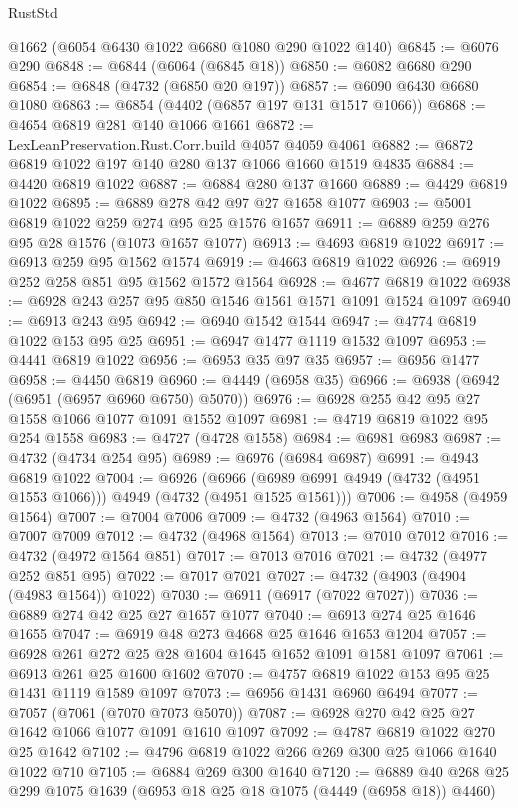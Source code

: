\begin{lexlean}{RustStd}
\begin{coremodule}
{\begin{coremodule}
{{{{{{{{{{{{{{    @1662
    (@6054 @6430 @1022 @6680 @1080 @290 @1022 @140)
@6845 := @6076 @290
@6848 := @6844 (@6064 (@6845 @18))
@6850 := @6082 @6680 @290
@6854 := @6848 (@4732 (@6850 @20 @197))
@6857 := @6090 @6430 @6680 @1080
@6863 := @6854 (@4402 (@6857 @197 @131 @1517 @1066))
@6868 := @4654 @6819 @281 @140 @1066 @1661
@6872 := LexLeanPreservation.Rust.Corr.build @4057 @4059 @4061
@6882 := @6872 @6819 @1022 @197 @140 @280 @137 @1066 @1660 @1519 @4835
@6884 := @4420 @6819 @1022
@6887 := @6884 @280 @137 @1660
@6889 := @4429 @6819 @1022
@6895 := @6889 @278 @42 @97 @27 @1658 @1077
@6903 := @5001 @6819 @1022 @259 @274 @95 @25 @1576 @1657
@6911 := @6889 @259 @276 @95 @28 @1576 (@1073 @1657 @1077)
@6913 := @4693 @6819 @1022
@6917 := @6913 @259 @95 @1562 @1574
@6919 := @4663 @6819 @1022
@6926 := @6919 @252 @258 @851 @95 @1562 @1572 @1564
@6928 := @4677 @6819 @1022
@6938 := @6928 @243 @257 @95 @850 @1546 @1561 @1571 @1091 @1524 @1097
@6940 := @6913 @243 @95
@6942 := @6940 @1542 @1544
@6947 := @4774 @6819 @1022 @153 @95 @25
@6951 := @6947 @1477 @1119 @1532 @1097
@6953 := @4441 @6819 @1022
@6956 := @6953 @35 @97 @35
@6957 := @6956 @1477
@6958 := @4450 @6819
@6960 := @4449 (@6958 @35)
@6966 := @6938 (@6942 (@6951 (@6957 @6960 @6750) @5070))
@6976 := @6928 @255 @42 @95 @27 @1558 @1066 @1077 @1091 @1552 @1097
@6981 := @4719 @6819 @1022 @95 @254 @1558
@6983 := @4727 (@4728 @1558)
@6984 := @6981 @6983
@6987 := @4732 (@4734 @254 @95)
@6989 := @6976 (@6984 @6987)
@6991 := @4943 @6819 @1022
@7004 := @6926
    (@6966 (@6989 @6991 @4949 (@4732 (@4951 @1553 @1066))) @4949 (@4732 (@4951 @1525 @1561)))
@7006 := @4958 (@4959 @1564)
@7007 := @7004 @7006
@7009 := @4732 (@4963 @1564)
@7010 := @7007 @7009
@7012 := @4732 (@4968 @1564)
@7013 := @7010 @7012
@7016 := @4732 (@4972 @1564 @851)
@7017 := @7013 @7016
@7021 := @4732 (@4977 @252 @851 @95)
@7022 := @7017 @7021
@7027 := @4732 (@4903 (@4904 (@4983 @1564)) @1022)
@7030 := @6911 (@6917 (@7022 @7027))
@7036 := @6889 @274 @42 @25 @27 @1657 @1077
@7040 := @6913 @274 @25 @1646 @1655
@7047 := @6919 @48 @273 @4668 @25 @1646 @1653 @1204
@7057 := @6928 @261 @272 @25 @28 @1604 @1645 @1652 @1091 @1581 @1097
@7061 := @6913 @261 @25 @1600 @1602
@7070 := @4757 @6819 @1022 @153 @95 @25 @1431 @1119 @1589 @1097
@7073 := @6956 @1431 @6960 @6494
@7077 := @7057 (@7061 (@7070 @7073 @5070))
@7087 := @6928 @270 @42 @25 @27 @1642 @1066 @1077 @1091 @1610 @1097
@7092 := @4787 @6819 @1022 @270 @25 @1642
@7102 := @4796 @6819 @1022 @266 @269 @300 @25 @1066 @1640 @1022 @710
@7105 := @6884 @269 @300 @1640
@7120 := @6889 @40 @268 @25 @299 @1075 @1639 (@6953 @18 @25 @18 @1075 (@4449 (@6958 @18)) @4460)
}}}}}}}}}}}}}}
\end{coremodule}}
\end{coremodule}
\end{lexlean}
